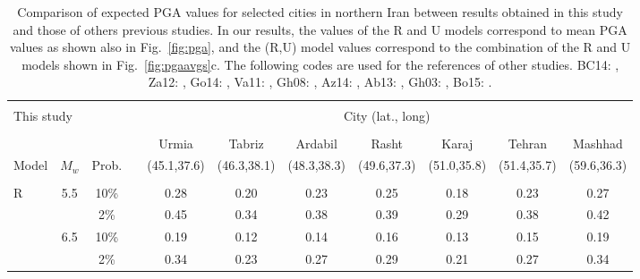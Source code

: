 \begin{table*}[t]
\centering
\caption{Comparison of expected PGA values for selected cities in northern Iran between results obtained in this study and those of others previous studies. In our results, the values of the R and U models correspond to mean PGA values as shown also in Fig.~\ref{fig:pga}, and the (R,U) model values correspond to the combination of the R and U models shown in Fig.~\ref{fig:pgaavgs}c. The following codes are used for the references of other studies.
    BC14: \citet{BHRC2014},
    Za12: \citet{Zare2012},
    Go14: \citet{Golara2014},
    Va11: \citet{Vafaie2011},
    Gh08: \citet{Ghodrati2008},
    Az14: \citet{Abdollahzadeh2014a},
    Ab13: \citet{Abdi2013},
    Gh03: \citet{Ghodrati2003},
    Bo15: \citet{Boostan2015}.
    }
\begin{tabular}{lcccccccccc}
    \hline                                                                                                                      \\[-1.6ex]
    \multicolumn{2}{l}{This study}  
                    &        && \multicolumn{7}{c}{City (lat., long)}                                                           \\[0.6ex]
    \cline{5-11}                                                                                                                \\[-1.6ex]
            &       &        &&   Urmia     &   Tabriz    &   Ardabil   &   Rasht     &   Karaj     &   Tehran    &   Mashhad   \\
    Model   & $M_w$ & Prob.  && (45.1,37.6) & (46.3,38.1) & (48.3,38.3) & (49.6,37.3) & (51.0,35.8) & (51.4,35.7) & (59.6,36.3) \\[0.6ex]
    \cline{1-3} \cline{5-11}                                                                                                    \\[-1.6ex]
    R       &   5.5 &  10\%  &&   0.28      &   0.20      &   0.23      &   0.25      &   0.18      &   0.23      &   0.27      \\
            &       &   2\%  &&   0.45      &   0.34      &   0.38      &   0.39      &   0.29      &   0.38      &   0.42      \\
            &   6.5 &  10\%  &&   0.19      &   0.12      &   0.14      &   0.16      &   0.13      &   0.15      &   0.19      \\
            &       &   2\%  &&   0.34      &   0.23      &   0.27      &   0.29      &   0.21      &   0.27      &   0.34      \\

\end{tabular}
\end{table*}
